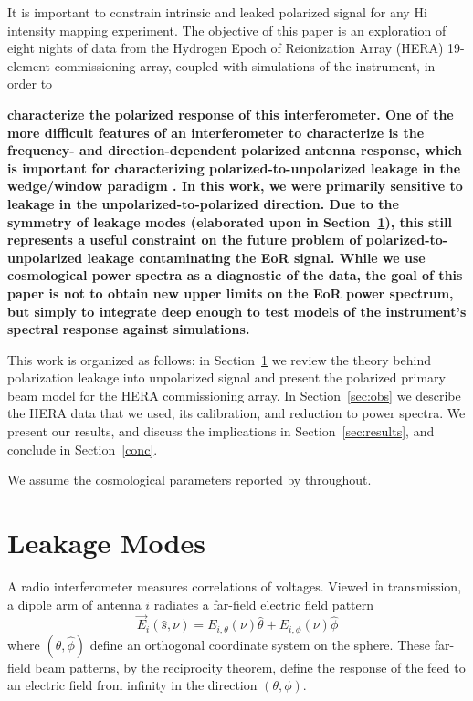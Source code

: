 \documentclass[twocolumn, trackchanges]{aastex61}
\newcommand{\edited}[1]{{\bf \color{blue} #1}}
\begin{document}
It is important to constrain intrinsic and leaked polarized signal for any {\sc Hi} intensity mapping experiment. The objective of this paper is an exploration of eight nights of data from the Hydrogen Epoch of Reionization Array (HERA) 19-element commissioning array, coupled with simulations of the instrument, in order to \edited{characterize the polarized response of this interferometer.  
One of the more difficult features of an interferometer to characterize is the frequency- and direction-dependent polarized antenna response, which is important for characterizing polarized-to-unpolarized leakage in the wedge/window paradigm \citep{Moore17,Nunhokee.17,Martinot18}.
In this work, we were primarily sensitive to leakage in the unpolarized-to-polarized direction. Due to the symmetry of leakage modes (elaborated upon in Section~\ref{sec:leak}), this still represents a useful constraint on the future problem of polarized-to-unpolarized leakage contaminating the EoR signal.
While we use cosmological power spectra as a diagnostic of the data, the goal of this paper is not to obtain new upper limits on the EoR power spectrum, but simply to integrate deep enough to test models of the instrument's spectral response against simulations.

This work is organized as follows: in Section~\ref{sec:leak} we review the theory behind polarization leakage into unpolarized signal and present the polarized primary beam model for the HERA commissioning array. In Section~\ref{sec:obs} we describe the HERA data that we used, its calibration, and reduction to power spectra. We present our results, and discuss the implications in Section~\ref{sec:results}, and conclude in Section~\ref{conc}. 

We assume the cosmological parameters reported by \cite{Planck.16} throughout.
}

\section{Leakage Modes}
\label{sec:leak}

A radio interferometer measures correlations of voltages. Viewed in transmission, a dipole arm of antenna $i$ radiates a far-field electric field pattern
\begin{equation}
\vec{E}_{i}(\hat{s}, \nu) = E_{i,\theta}(\nu)\hat{\theta} + E_{i,\phi}(\nu)\hat{\phi}
\end{equation}
where $(\hat{\theta},\hat{\phi})$ define an orthogonal coordinate system on the sphere. These far-field beam patterns, by the reciprocity theorem, define the response of the feed to an electric field from infinity in the direction $(\theta,\phi)$. 
\end{document}
